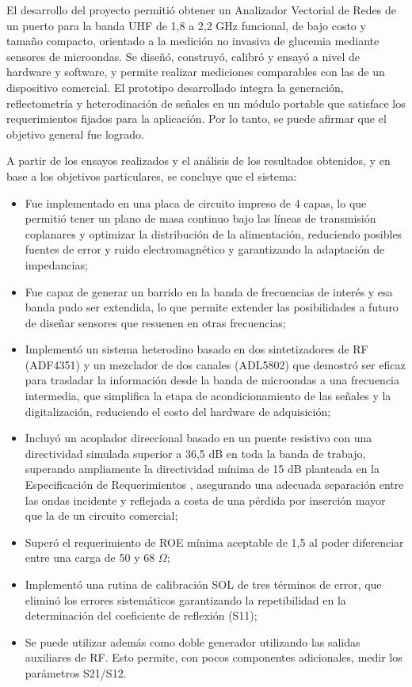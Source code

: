 El desarrollo del proyecto permitió obtener un Analizador Vectorial de Redes de un puerto para la banda UHF de 1,8 a 2,2 GHz funcional, de bajo costo y tamaño compacto, orientado a la medición no invasiva de glucemia mediante sensores de microondas. Se diseñó, construyó, calibró y ensayó a nivel de hardware y software, y permite realizar mediciones comparables con las de un dispositivo comercial. El prototipo desarrollado integra la generación, reflectometría y heterodinación de señales en un módulo portable que satisface los requerimientos fijados para la aplicación. Por lo tanto, se puede afirmar que el objetivo general fue logrado. 

A partir de los ensayos realizados y el análisis de los resultados obtenidos, y en base a los objetivos particulares, se concluye que el sistema:
\begin{itemize}
    \item Fue implementado en una placa de circuito impreso de 4 capas, lo que permitió tener un plano de masa continuo bajo las líneas de transmisión coplanares y optimizar la distribución de la alimentación, reduciendo posibles fuentes de error y ruido electromagnético y garantizando la adaptación de impedancias;
    \item Fue capaz de generar un barrido en la banda de frecuencias de interés y esa banda pudo ser extendida, lo que permite extender las posibilidades a futuro de diseñar sensores que resuenen en otras frecuencias;
    \item Implementó un sistema heterodino basado en dos sintetizadores de RF (ADF4351) y un mezclador de dos canales (ADL5802) que demostró ser eficaz para trasladar la información desde la banda de microondas a una frecuencia intermedia, que simplifica la etapa de acondicionamiento de las señales y la digitalización, reduciendo el costo del hardware de adquisición;
    \item Incluyó un acoplador direccional basado en un puente resistivo con una directividad simulada superior a 36,5 dB en toda la banda de trabajo, superando ampliamente la directividad mínima de 15 dB planteada en la Especificación de Requerimientos \cite{ER}, asegurando una adecuada separación entre las ondas incidente y reflejada a costa de una pérdida por inserción mayor que la de un circuito comercial;
    \item Superó el requerimiento de ROE mínima aceptable de 1,5 al poder diferenciar entre una carga de 50 y 68 $\Omega$;
    \item Implementó una rutina de calibración SOL de tres términos de error, que eliminó los errores sistemáticos garantizando la repetibilidad en la determinación del coeficiente de reflexión (S11);
    \item Se puede utilizar además como doble generador utilizando las salidas auxiliares de RF. Esto permite, con pocos componentes adicionales, medir los parámetros S21/S12.
\end{itemize}


